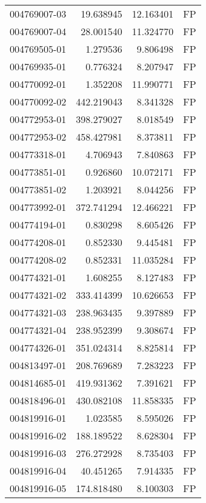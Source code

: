 \begin{tabular}{lrrl}
004769007-03 &   19.638945 &      12.163401 &   FP \\
004769007-04 &   28.001540 &      11.324770 &   FP \\
004769505-01 &    1.279536 &       9.806498 &   FP \\
004769935-01 &    0.776324 &       8.207947 &   FP \\
004770092-01 &    1.352208 &      11.990771 &   FP \\
004770092-02 &  442.219043 &       8.341328 &   FP \\
004772953-01 &  398.279027 &       8.018549 &   FP \\
004772953-02 &  458.427981 &       8.373811 &   FP \\
004773318-01 &    4.706943 &       7.840863 &   FP \\
004773851-01 &    0.926860 &      10.072171 &   FP \\
004773851-02 &    1.203921 &       8.044256 &   FP \\
004773992-01 &  372.741294 &      12.466221 &   FP \\
004774194-01 &    0.830298 &       8.605426 &   FP \\
004774208-01 &    0.852330 &       9.445481 &   FP \\
004774208-02 &    0.852331 &      11.035284 &   FP \\
004774321-01 &    1.608255 &       8.127483 &   FP \\
004774321-02 &  333.414399 &      10.626653 &   FP \\
004774321-03 &  238.963435 &       9.397889 &   FP \\
004774321-04 &  238.952399 &       9.308674 &   FP \\
004774326-01 &  351.024314 &       8.825814 &   FP \\
004813497-01 &  208.769689 &       7.283223 &   FP \\
004814685-01 &  419.931362 &       7.391621 &   FP \\
004818496-01 &  430.082108 &      11.858335 &   FP \\
004819916-01 &    1.023585 &       8.595026 &   FP \\
004819916-02 &  188.189522 &       8.628304 &   FP \\
004819916-03 &  276.272928 &       8.735403 &   FP \\
004819916-04 &   40.451265 &       7.914335 &   FP \\
004819916-05 &  174.818480 &       8.100303 &   FP \\

\end{tabular}
